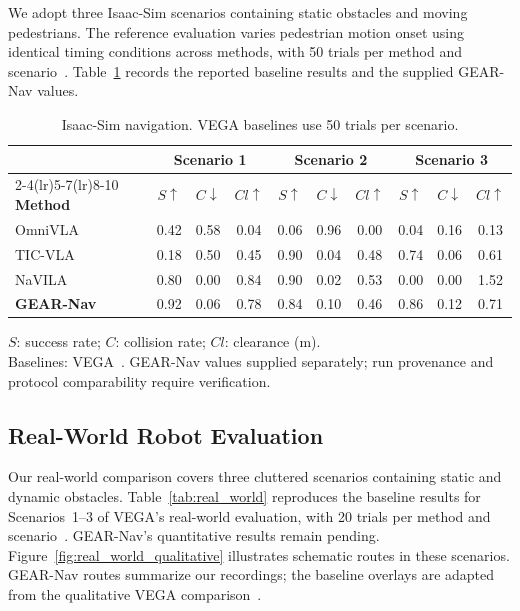 \documentclass[letterpaper, 10 pt, conference]{ieeeconf}  %
\begin{document}
We adopt three Isaac-Sim scenarios containing static obstacles and moving
pedestrians. The reference evaluation varies pedestrian motion onset using
identical timing conditions across methods, with 50 trials per method and
scenario~\cite{vega}. Table~\ref{tab:isaac_sim} records the reported baseline
results and the supplied GEAR-Nav values.

\begin{table}[!tb]
\centering
\caption{Isaac-Sim navigation. VEGA baselines use 50 trials per scenario.}
\label{tab:isaac_sim}
\footnotesize
\setlength{\tabcolsep}{2pt}
\renewcommand{\arraystretch}{1.08}
\begin{tabular*}{\columnwidth}{@{\extracolsep{\fill}}lccc@{\hspace{7pt}}ccc@{\hspace{7pt}}ccc@{}}
\toprule
& \multicolumn{3}{c}{\textbf{Scenario 1}}
& \multicolumn{3}{c}{\textbf{Scenario 2}}
& \multicolumn{3}{c}{\textbf{Scenario 3}} \\
\cmidrule(lr){2-4}\cmidrule(lr){5-7}\cmidrule(lr){8-10}
\textbf{Method}
& $S\uparrow$ & $C\downarrow$ & $Cl\uparrow$
& $S\uparrow$ & $C\downarrow$ & $Cl\uparrow$
& $S\uparrow$ & $C\downarrow$ & $Cl\uparrow$ \\
\midrule
OmniVLA
& 0.42 & 0.58 & 0.04
& 0.06 & 0.96 & 0.00
& 0.04 & 0.16 & 0.13 \\
TIC-VLA
& 0.18 & 0.50 & 0.45
& 0.90 & 0.04 & 0.48
& 0.74 & 0.06 & 0.61 \\
NaVILA
& 0.80 & 0.00 & 0.84
& 0.90 & 0.02 & 0.53
& 0.00 & 0.00 & 1.52 \\
\midrule
\textbf{GEAR-Nav}
& 0.92 & 0.06 & 0.78
& 0.84 & 0.10 & 0.46
& 0.86 & 0.12 & 0.71 \\
\bottomrule
\end{tabular*}
\par\vspace{2pt}
\parbox{\columnwidth}{\scriptsize\raggedright
$S$: success rate; $C$: collision rate; $Cl$: clearance (m).\\
Baselines: VEGA~\cite{vega}. GEAR-Nav values supplied separately; run provenance and protocol comparability require verification.}
\end{table}

\subsection{Real-World Robot Evaluation}
\label{sec:real_world}

Our real-world comparison covers three cluttered scenarios containing static
and dynamic obstacles. Table~\ref{tab:real_world} reproduces the baseline
results for Scenarios~1--3 of VEGA's real-world evaluation, with 20 trials
per method and scenario~\cite{vega}. GEAR-Nav's quantitative results remain
pending.
Figure~\ref{fig:real_world_qualitative} illustrates schematic routes in these
scenarios. GEAR-Nav routes summarize our recordings; the baseline overlays
are adapted from the qualitative VEGA comparison~\cite{vega}.
\end{document}
